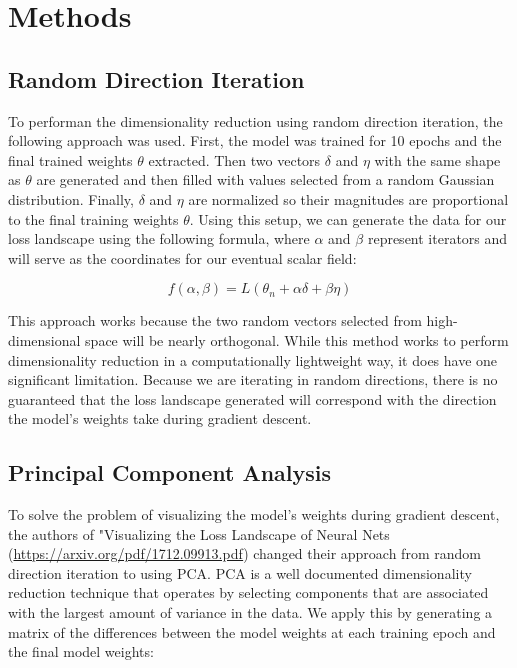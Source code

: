 \documentclass{acmsiggraph}
\begin{document}
\section{Methods}
\label{sec:intro}
\subsection{Random Direction Iteration}
To performan the dimensionality reduction using random direction iteration, the following approach was used. First, the model was trained for 10 epochs and the final trained weights $\theta$ extracted. Then two vectors $\delta$ and $\eta$ with the same shape as $\theta$ are generated and then filled with values selected from a random Gaussian distribution. Finally, $\delta$ and $\eta$ are normalized so their magnitudes are proportional to the final training weights $\theta$. Using this setup, we can generate the data for our loss landscape using the following formula, where $\alpha$ and $\beta$ represent iterators and will serve as the coordinates for our eventual scalar field:

\begin{equation} \label{eq1}
f(\alpha, \beta) = L(\theta_n + \alpha\delta + \beta\eta) 
\end{equation}

This approach works because the two random vectors selected from high-dimensional space will be nearly orthogonal. While this method works to perform dimensionality reduction in a computationally lightweight way, it does have one significant limitation. Because we are iterating in random directions, there is no guaranteed that the loss landscape generated will correspond with the direction the model's weights take during gradient descent. 

\subsection{Principal Component Analysis}

To solve the problem of visualizing the model's weights during gradient descent, the authors of "Visualizing the Loss Landscape of Neural Nets (\url{https://arxiv.org/pdf/1712.09913.pdf}) changed their approach from random direction iteration to using PCA. PCA is a well documented dimensionality reduction technique that operates by selecting components that are associated with the largest amount of variance in the data. We apply this by generating a matrix of the differences between the model weights at each training epoch and the final model weights:
\end{document}
